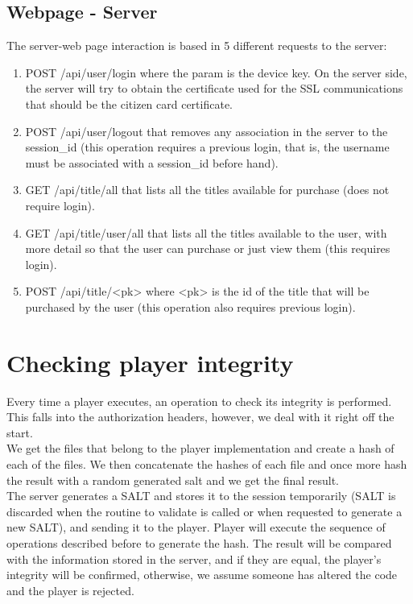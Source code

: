 \documentclass[11pt,a4paper]{report}
\begin{document}
\subsection{Webpage - Server}
The server-web page interaction is based in 5 different requests to the server:
\begin{enumerate}
\item POST  /api/user/login where the param is the device key. On the server side, the server will try to obtain the certificate used for the SSL communications that should be the citizen card certificate.
\item POST  /api/user/logout that removes any association in the server to the session\_id (this operation requires a previous login, that is, the username must be associated with a session\_id before hand).
\item GET   /api/title/all that lists all the titles available for purchase (does not require login).
\item GET   /api/title/user/all that lists all the titles available to the user, with more detail so that the user can purchase or just view them (this requires login).
\item POST  /api/title/<pk> where <pk> is the id of the title that will be purchased by the user (this operation also requires previous login).
\end{enumerate}

\section{Checking player integrity}
\label{sec:integrity}
Every time a player executes, an operation to check its integrity is performed. This falls into the authorization headers, however, we deal with it right off the start.\\

We get the files that belong to the player implementation and create a hash of each of the files. We then concatenate the hashes of each file and once more hash the result with a random generated salt and we get the final result.\\

The server generates a SALT and stores it to the session temporarily (SALT is discarded when the routine to validate is called or when requested to generate a new SALT), and sending it to the player. Player will execute the sequence of operations described before to generate the hash. The result will be compared with the information stored in the server, and if they are equal, the player's integrity will be confirmed, otherwise, we assume someone has altered the code and the player is rejected.
\end{document}
